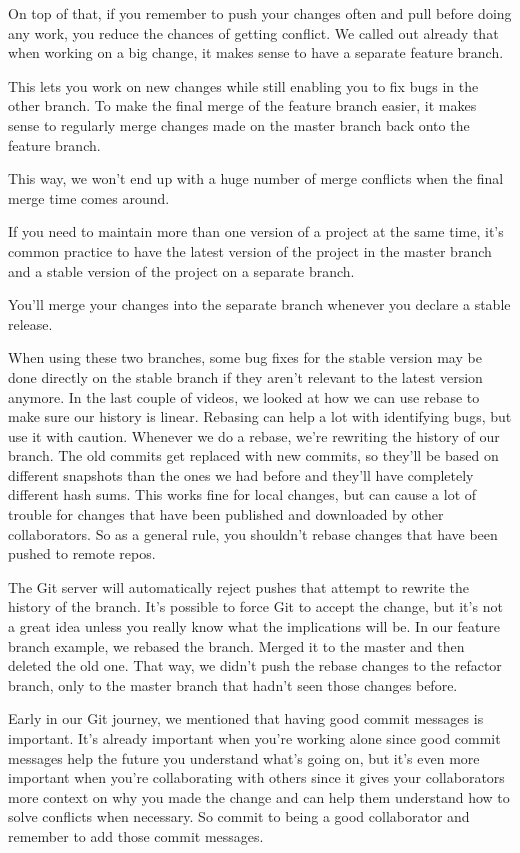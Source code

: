 On top of that, if you remember to push your changes often and pull before doing any work, you reduce the chances of getting conflict. We called out already that when working on a big change, it makes sense to have a separate feature branch.

This lets you work on new changes while still enabling you to fix bugs in the other branch. To make the final merge of the feature branch easier, it makes sense to regularly merge changes made on the master branch back onto the feature branch.

This way, we won't end up with a huge number of merge conflicts when the final merge time comes around.

If you need to maintain more than one version of a project at the same time, it's common practice to have the latest version of the project in the master branch and a stable version of the project on a separate branch.

You'll merge your changes into the separate branch whenever you declare a stable release.

When using these two branches, some bug fixes for the stable version may be done directly on the stable branch if they aren't relevant to the latest version anymore. In the last couple of videos, we looked at how we can use rebase to make sure our history is linear. Rebasing can help a lot with identifying bugs, but use it with caution. Whenever we do a rebase, we're rewriting the history of our branch. The old commits get replaced with new commits, so they'll be based on different snapshots than the ones we had before and they'll have completely different hash sums. This works fine for local changes, but can cause a lot of trouble for changes that have been published and downloaded by other collaborators. So as a general rule, you shouldn't rebase changes that have been pushed to remote repos.

The Git server will automatically reject pushes that attempt to rewrite the history of the branch. It's possible to force Git to accept the change, but it's not a great idea unless you really know what the implications will be. In our feature branch example, we rebased the branch. Merged it to the master and then deleted the old one. That way, we didn't push the rebase changes to the refactor branch, only to the master branch that hadn't seen those changes before.

Early in our Git journey, we mentioned that having good commit messages is important. It's already important when you're working alone since good commit messages help the future you understand what's going on, but it's even more important when you're collaborating with others since it gives your collaborators more context on why you made the change and can help them understand how to solve conflicts when necessary. So commit to being a good collaborator and remember to add those commit messages.


